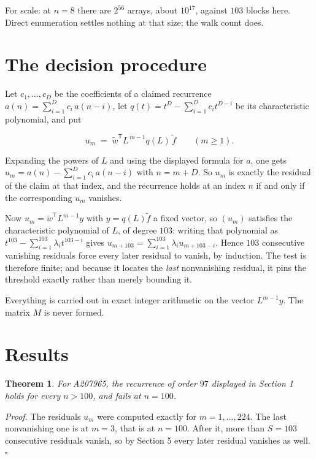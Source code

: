 \documentclass[11pt]{article}
\newtheorem{theorem}{Theorem}
\theoremstyle{definition}
\begin{document}
For scale: at $n = 8$ there are $2^{56}$ arrays, about $10^{17}$, against $103$ blocks here. Direct enumeration settles nothing at that size; the walk count does.

\section{The decision procedure}

Let $c_1,\dots,c_D$ be the coefficients of a claimed recurrence $a(n) = \sum_{i=1}^{D} c_i\,a(n-i)$, let $q(t) = t^{D} - \sum_{i=1}^{D} c_i t^{D-i}$ be its characteristic polynomial, and put

\[u_m \;=\; \tilde w^{\mathsf T} L^{\,m-1} q(L)\,\tilde f \qquad (m \ge 1).\]

Expanding the powers of $L$ and using the displayed formula for $a$, one gets $u_m = a(n) - \sum_{i=1}^{D} c_i\,a(n-i)$ with $n = m + D$. So $u_m$ is exactly the residual of the claim at that index, and the recurrence holds at an index $n$ if and only if the corresponding $u_m$ vanishes.

Now $u_m = \tilde w^{\mathsf T} L^{m-1} y$ with $y = q(L)\tilde f$ a fixed vector, so $(u_m)$ satisfies the characteristic polynomial of $L$, of degree $103$: writing that polynomial as $t^{103} - \sum_{i=1}^{103} \lambda_i t^{103-i}$ gives $u_{m+103} = \sum_{i=1}^{103} \lambda_i u_{m+103-i}$. Hence $103$ consecutive vanishing residuals force every later residual to vanish, by induction. The test is therefore finite; and because it locates the {\itshape last} nonvanishing residual, it pins the threshold exactly rather than merely bounding it.

Everything is carried out in exact integer arithmetic on the vector $L^{m-1}y$. The matrix $M$ is never formed.

\section{Results}

\begin{theorem} For A207965, the recurrence of order $97$ displayed in Section 1 holds for every $n > 100$, and fails at $n = 100$.\end{theorem}

{\itshape Proof.} The residuals $u_m$ were computed exactly for $m = 1,\dots,224$. The last nonvanishing one is at $m = 3$, that is at $n = 100$. After it, more than $S = 103$ consecutive residuals vanish, so by Section 5 every later residual vanishes as well. $\square$
\end{document}
